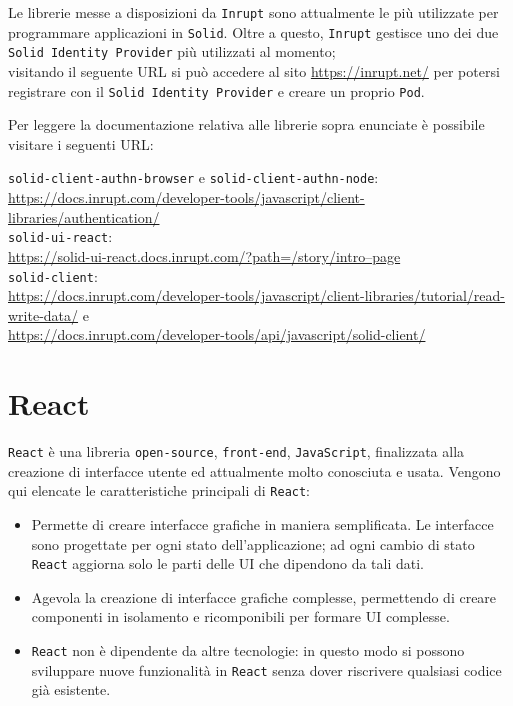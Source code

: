 \medskip

Le librerie messe a disposizioni da {\tt Inrupt} sono attualmente le più utilizzate per programmare applicazioni in {\tt Solid}. Oltre a questo, {\tt Inrupt} gestisce uno dei due {\tt Solid Identity Provider} più utilizzati al momento;\\
visitando il seguente URL si può accedere al sito \href{https://inrupt.net/}{https://inrupt.net/} per potersi\\registrare con il {\tt Solid Identity Provider} e creare un proprio {\tt Pod}.

\medskip

Per leggere la documentazione relativa alle librerie sopra enunciate è possibile\\visitare i seguenti URL:

{\tt solid-client-authn-browser} e {\tt solid-client-authn-node}:\\ \href{https://docs.inrupt.com/developer-tools/javascript/client-libraries/authentication/}{https://docs.inrupt.com/developer-tools/javascript/client-libraries/authentication/}\\
{\tt solid-ui-react}:\\ \href{https://solid-ui-react.docs.inrupt.com/?path=/story/intro--page}{https://solid-ui-react.docs.inrupt.com/?path=/story/intro--page} \\
{\tt solid-client}:\\
\href{https://docs.inrupt.com/developer-tools/javascript/client-libraries/tutorial/read-write-data/}{https://docs.inrupt.com/developer-tools/javascript/client-libraries/tutorial/read-write-data/} e\\
\href{https://docs.inrupt.com/developer-tools/api/javascript/solid-client/}{https://docs.inrupt.com/developer-tools/api/javascript/solid-client/}

\medskip

\section{React}

\medskip

{\tt React} è una libreria {\tt open-source}, {\tt front-end}, {\tt JavaScript}, finalizzata alla creazione di interfacce utente ed attualmente molto conosciuta e usata. Vengono qui elencate le caratteristiche principali di {\tt React}:

\medskip 

\begin{itemize}
	\item Permette di creare interfacce grafiche in maniera semplificata. Le interfacce sono progettate per ogni stato dell'applicazione; ad ogni cambio di stato {\tt React} aggiorna solo le parti delle UI che dipendono da tali dati.
	\item Agevola la creazione di interfacce grafiche complesse, permettendo di creare componenti in isolamento e ricomponibili per formare UI complesse.
	\item {\tt React} non è dipendente da altre tecnologie: in questo modo si possono sviluppare nuove funzionalità in {\tt React} senza dover riscrivere qualsiasi codice già esistente.
\end{itemize}

